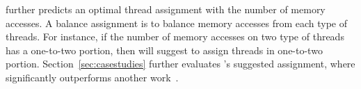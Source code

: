 \NP{} further predicts an optimal thread assignment with the number of memory accesses. A balance assignment is to balance  memory accesses from each type of threads. For instance, if the number of memory accesses on two type of threads has a one-to-two portion, then \NP{} will suggest to assign threads in one-to-two portion. Section~\ref{sec:casestudies} further evaluates \NP{}'s suggested assignment, where \NP{} significantly outperforms another work~\cite{SyncPerf}.


\begin{comment}
We also propose two mechanisms to solve load imbalance issues according thread based memory access pattern.First of all, \NP{} recorded how many memory access requests produced in each thread, and threads are classified into different groups based on the type of tasks executed on threads. If there is only one single thread group in the whole application, no load balanced problems will be reported.Unless, \NP{} will recommend how many threads are needed in each group based on memory access overheads per group-$Opg_{NUMA}$. Basically the group with more memory overheads will get more threads, since more memory access overheads typically means more workloads and can be eliminated by more workers.

\begin{equation}
Opt_{NUMA} = Lmr + Rmr * RL  \label{Opt_NUMA}
\end{equation}

Equation\ref{Opt_NUMA} defines $Opt_{NUMA}$(memory access overheads per thread), in which Lmr represents the number of local memory requests, Rmr represents the number of remote memory requests and RL means the average remote access latency normalized by local access latency. 2 is assigned to RL in \NP{} by heuristic.And $Opg_{NUMA}$(memory access overheads per group) is computed simply by summing $Opt_{NUMA}$ for each thread in this group.


\end{comment}
